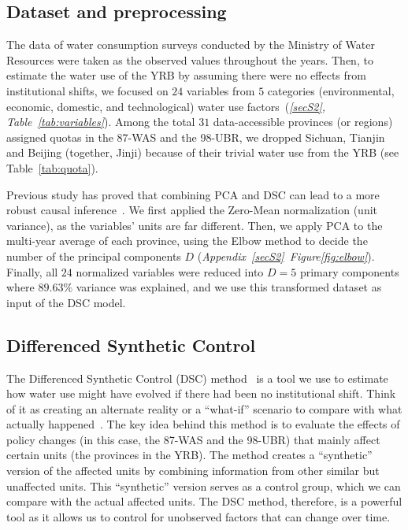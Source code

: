\subsection{Dataset and preprocessing}\label{sec:dataset}
The data of water consumption surveys conducted by the Ministry of Water Resources were taken as the observed values throughout the years.
Then, to estimate the water use of the YRB by assuming there were no effects from institutional shifts, we focused on $24$ variables from $5$ categories (environmental, economic, domestic, and technological) water use factors~(\textit{\ref{secS2}, Table~\ref{tab:variables}}).
Among the total $31$ data-accessible provinces (or regions) assigned quotas in the 87-WAS and the 98-UBR, we dropped Sichuan, Tianjin and Beijing (together, Jinji) because of their trivial water use from the YRB (see Table~\ref{tab:quota}).

Previous study has proved that combining PCA and DSC can lead to a more robust causal inference~\cite{bayani2021}.
We first applied the Zero-Mean normalization (unit variance), as the variables' units are far different. Then, we apply PCA to the multi-year average of each province, using the Elbow method to decide the number of the principal components $D$ (\textit{Appendix~\ref{secS2}~Figure\ref{fig:elbow}}).
Finally, all $24$ normalized variables were reduced into $D = 5$ primary components where $89.63\%$ variance was explained, and we use this transformed dataset as input of the DSC model.

\subsection{Differenced Synthetic Control}\label{sec:DSC}

The Differenced Synthetic Control (DSC) method~\cite{arkhangelsky2021} is a tool we use to estimate how water use might have evolved if there had been no institutional shift.
Think of it as creating an alternate reality or a ``what-if'' scenario to compare with what actually happened~\cite{abadie2010, abadie2015, hill2021}.
The key idea behind this method is to evaluate the effects of policy changes (in this case, the 87-WAS and the 98-UBR) that mainly affect certain units (the provinces in the YRB).
The method creates a ``synthetic'' version of the affected units by combining information from other similar but unaffected units. This ``synthetic'' version serves as a control group, which we can compare with the actual affected units.
The DSC method, therefore, is a powerful tool as it allows us to control for unobserved factors that can change over time.

